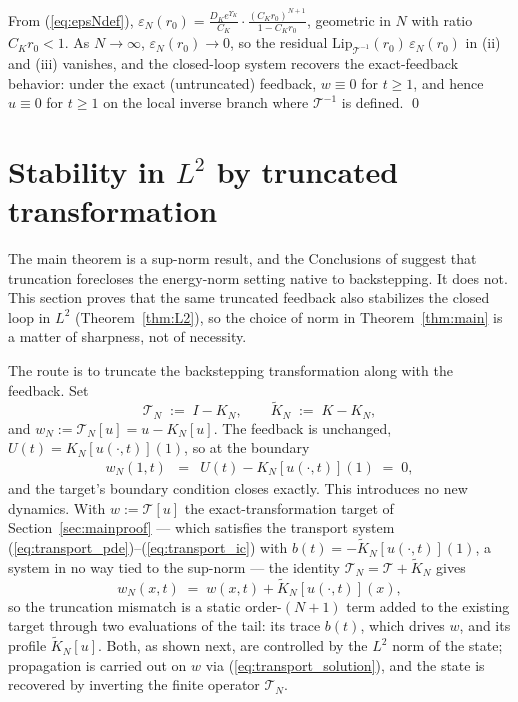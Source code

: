 \documentclass[amsthm]{autart}
\theoremstyle{plain}
\theoremstyle{definition}
\newcommand{\Tcal}{\mathcal{T}}
\newcommand{\Ltwo}{L^2}
\newcommand{\LipT}{\mathrm{Lip}_{\Tcal^{-1}}}
\newcommand{\eps}{\varepsilon}
\begin{document}
From (\ref{eq:epsNdef}), $\eps_N(r_0) = \frac{D_K e^{\Upsilon_K}}{C_K}\cdot \frac{(C_K r_0)^{N+1}}{1 - C_K r_0}$, geometric in $N$ with ratio $C_K r_0 < 1$. As $N \to \infty$, $\eps_N(r_0) \to 0$, so the residual $\LipT(r_0)\,\eps_N(r_0)$ in (ii) and (iii) vanishes, and the closed-loop system recovers the exact-feedback behavior: under the exact (untruncated) feedback, $w \equiv 0$ for $t \ge 1$, and hence $u \equiv 0$ for $t \ge 1$ on the local inverse branch where $\Tcal^{-1}$ is defined. \qed

\section{Stability in $\Ltwo$ by truncated transformation}\label{sec:L2}

The main theorem is a sup-norm result, and the Conclusions of \cite{krstic2026feedbacklinearizationhyperbolicpdes} suggest that truncation forecloses the energy-norm setting native to backstepping. It does not. This section proves that the same truncated feedback also stabilizes the closed loop in $\Ltwo$ (Theorem~\ref{thm:L2}), so the choice of norm in Theorem~\ref{thm:main} is a matter of sharpness, not of necessity.

The route is to truncate the backstepping transformation along with the feedback. Set
\begin{equation}
\Tcal_N \;:=\; I - K_N, \qquad \widetilde K_N \;:=\; K - K_N,
\label{eq:TNdef}
\end{equation}
and $w_N := \Tcal_N[u] = u - K_N[u]$. The feedback is unchanged, $U(t) = K_N[u(\cdot,t)](1)$, so at the boundary
\begin{eqnarray}
w_N(1,t) &=& U(t) - K_N[u(\cdot,t)](1) \;=\; 0,
\label{eq:wN_bdy}
\end{eqnarray}
and the target's boundary condition closes exactly. This introduces no new dynamics. With $w := \Tcal[u]$ the exact-transformation target of Section~\ref{sec:mainproof} --- which satisfies the transport system (\ref{eq:transport_pde})--(\ref{eq:transport_ic}) with $b(t) = -\widetilde K_N[u(\cdot,t)](1)$, a system in no way tied to the sup-norm --- the identity $\Tcal_N = \Tcal + \widetilde K_N$ gives
\begin{equation}
w_N(x,t) \;=\; w(x,t) + \widetilde K_N[u(\cdot,t)](x),
\label{eq:wN_decomp}
\end{equation}
so the truncation mismatch is a static order-$(N{+}1)$ term added to the existing target through two evaluations of the tail: its trace $b(t)$, which drives $w$, and its profile $\widetilde K_N[u]$. Both, as shown next, are controlled by the $\Ltwo$ norm of the state; propagation is carried out on $w$ via (\ref{eq:transport_solution}), and the state is recovered by inverting the finite operator $\Tcal_N$.
\end{document}
